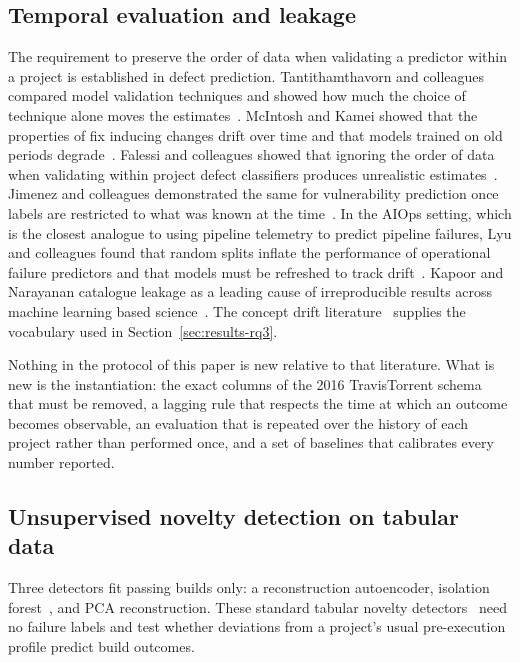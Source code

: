 \documentclass[sigconf,review,anonymous,nonacm]{acmart}
\begin{document}
\subsection{Temporal evaluation and leakage}
\label{sec:related-temporal}

The requirement to preserve the order of data when validating a predictor within a project is established in defect prediction. Tantithamthavorn and colleagues compared model validation techniques and showed how much the choice of technique alone moves the estimates~\cite{tantithamthavorn2017}. McIntosh and Kamei showed that the properties of fix inducing changes drift over time and that models trained on old periods degrade~\cite{mcintosh2018}. Falessi and colleagues showed that ignoring the order of data when validating within project defect classifiers produces unrealistic estimates~\cite{falessi2020}. Jimenez and colleagues demonstrated the same for vulnerability prediction once labels are restricted to what was known at the time~\cite{jimenez2019}. In the AIOps setting, which is the closest analogue to using pipeline telemetry to predict pipeline failures, Lyu and colleagues found that random splits inflate the performance of operational failure predictors and that models must be refreshed to track drift~\cite{lyu2021splitting, lyu2022interpretation}. Kapoor and Narayanan catalogue leakage as a leading cause of irreproducible results across machine learning based science~\cite{kapoor2023}. The concept drift literature~\cite{gama2014} supplies the vocabulary used in Section~\ref{sec:results-rq3}.

Nothing in the protocol of this paper is new relative to that literature. What is new is the instantiation: the exact columns of the 2016 TravisTorrent schema that must be removed, a lagging rule that respects the time at which an outcome becomes observable, an evaluation that is repeated over the history of each project rather than performed once, and a set of baselines that calibrates every number reported.

\subsection{Unsupervised novelty detection on tabular data}
\label{sec:related-ad}

Three detectors fit passing builds only: a reconstruction autoencoder, isolation forest~\cite{liu2008}, and PCA reconstruction. These standard tabular novelty detectors~\cite{chandola2009, ruff2021} need no failure labels and test whether deviations from a project's usual pre-execution profile predict build outcomes.
\end{document}
